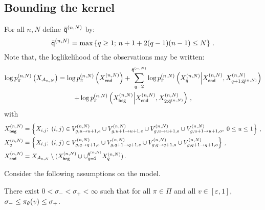 \subsection{Bounding the kernel}
For all $n,N$ define $\bar{\mathsf{q}}^{(n,N)}$ by:
\begin{equation}
\label{eq:ordermax}
\bar{\mathsf{q}}^{(n,N)} = \max\left\{q\ge 1;\, n+1 + 2(q-1)(n-1)\le N\right\}\,.
\end{equation}
Note that, the loglikelihood of the observations may be written:
\begin{multline*}
\log p_{\pi}^{(n,N)}\left(X_{\mathcal{A}_{n,N}}\right) = \log p_{\pi}^{(n,N)}\left(X_{\mathsf{end}}^{(n,N)}\right) + \sum_{q=2}^{\bar{\mathsf{q}}^{(n,N)}}  \log p_{\pi}^{(n,N)}\left(X_{q}^{(n,N)}\middle|X_{\mathsf{end}}^{(n,N)},X_{q+1:\bar{\mathsf{q}}^{(n,N)}}^{(n,N)}\right) \\
+  \log p_{\pi}^{(n,N)}\left(X_{\mathsf{beg}}^{(n,N)}\middle|X_{\mathsf{end}}^{(n,N)},X_{2:\bar{\mathsf{q}}^{(n,N)}}^{(n,N)}\right)\,,
\end{multline*}
with 
\begin{align*}
X_{\mathsf{beg}}^{(n,N)} & = \left\{X_{i,j};\;(i,j)\in V_{g,u\to u+1,e}^{(n,N)}\cup V_{g,u+1\to u+1,e}^{(n,N)}\cup V_{g,u\to u+1,o}^{(n,N)}\cup V_{g,u+1\to u+1,o}^{(n,N)},\;0\le u\le 1\right\}\,,\\
X_{q}^{(n,N)}                   & = \left\{X_{i,j};\;(i,j)\in V_{g,q\to q+1,e}^{(n,N)}\cup V_{g,q+1\to q+1,e}^{(n,N)}\cup V_{g,q\to q+1,o}^{(n,N)}\cup V_{g,q+1\to q+1,o}^{(n,N)}\right\} \,,\\
X_{\mathsf{end}}^{(n,N)} & = X_{\mathcal{A}_{n,N}}\setminus (X_{\mathsf{beg}}^{(n,N)}\cup\cup_{q=2}^{\bar{\mathsf{q}}^{(n,N)}} X_{q}^{(n,N)} )\,.
\end{align*}

Consider the following assumptions on the model.

\begin{hypH}
\label{assum:strongmix}
There exist $0<\sigma_-<\sigma_+<\infty$ such that for all $\pi\in\Pi$ and all $v\in [\varepsilon,1]$, $\sigma_-\le \pi_{\theta}(v)\le\sigma_+$.
\end{hypH}

